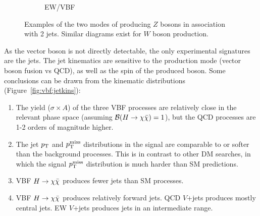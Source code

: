 \begin{figure}[]
\begin{center}
\begin{subfigure}[t]{0.49\textwidth}
            \caption{EW/VBF}
        \end{subfigure}
        \caption{Examples of the two modes of producing $Z$ bosons in association with 2 jets.
                 Similar diagrams exist for $W$ boson production.}
        \label{fig:vbf:ewqcd}
    \end{center}
\end{figure}

As the vector boson is not directly detectable, the only experimental signatures are the jets.
The jet kinematics are sensitive to the production mode (vector boson fusion vs QCD), as well as the spin of the produced boson.
Some conclusions can be drawn from the kinematic distributions (Figure~\ref{fig:vbf:jetkins}):
\begin{enumerate}
    \item The yield ($\sigma\times A$) of the three VBF processes are relatively close in the relevant phase space (assuming $\mathcal{B}(H\rightarrow\chi\bar\chi)=1$), but the QCD processes are 1-2 orders of magnitude higher.
    \item The jet $p_\mathrm{T}$ and $p_\mathrm{T}^\mathrm{miss}$ distributions in the signal are comparable to or softer than the background processes. 
          This is in contrast to other DM searches, in which the signal $p_\mathrm{T}^\mathrm{miss}$ distribution is much harder than SM predictions.
    \item VBF $H\rightarrow\chi\bar\chi$ produces fewer jets than SM processes.
    \item VBF $H\rightarrow\chi\bar\chi$ produces relatively forward jets. QCD $V$+jets produces mostly central jets. EW $V$+jets produces jets in an intermediate range. 
\end{enumerate}

